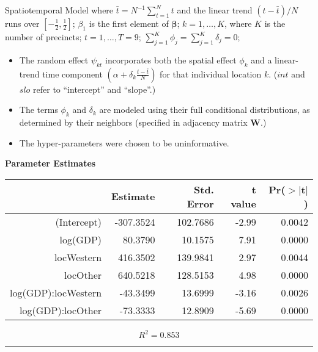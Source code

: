 \documentclass[final]{beamer}
\newlength{\colwidmiddle}
\begin{document}
\begin{frame}[t]
\begin{columns}[t]
\begin{column}{\colwidmiddle}
\begin{alertblock}{Spatiotemporal Model}
\vspace{-.5in}
where $\bar{t} = N^{-1}\sum_{t=1}^N t$ and the linear trend
$(t-\bar{t})/N$ runs over $[-\frac{1}{2}, \frac{1}{2}]$; \quad
$\beta_1$ is the first element of $\mathbf{\beta}$; \quad
$k = 1, \ldots, K$, where $K$ is the number of precincts; \quad
$t=1, \ldots, T=9$; \quad
$\sum_{j=1}^K \phi_j = \sum_{j=1}^K \delta_j = 0$; \quad


\vspace{.5in}

\begin{itemize}
\item The random effect $\psi_{kt}$ incorporates both the spatial
  effect $\phi_k$ and a linear-trend time component $(\alpha +
  \delta_k \frac{t - \bar{t}}{N})$ for that
  individual location $k$. ($int$ and $slo$ refer
  to ``intercept'' and ``slope''.)
\item The terms $\phi_k$ and $\delta_k$ are modeled using their full
  conditional distributions, as determined by their neighbors
  (specified in adjacency matrix $\mathbf{W}$.)
\item The hyper-parameters were chosen to be uninformative.
\end{itemize}




\vspace{1.5in}
\textbf{Parameter Estimates}    
   {\small 
     \begin{table}[ht]
       \centering
       \begin{tabular}{rrrrr}
  \hline
 & Estimate & Std. Error & t value & Pr($>$$|$t$|$) \\ 
  \hline
(Intercept) & -307.3524 & 102.7686 & -2.99 & 0.0042 \\ 
  log(GDP) & 80.3790 & 10.1575 & 7.91 & 0.0000 \\ 
  locWestern & 416.3502 & 139.9841 & 2.97 & 0.0044 \\ 
  locOther & 640.5218 & 128.5153 & 4.98 & 0.0000 \\ 
  log(GDP):locWestern & -43.3499 & 13.6999 & -3.16 & 0.0026 \\ 
  log(GDP):locOther & -73.3333 & 12.8909 & -5.69 & 0.0000 \\ 
   \hline
\end{tabular}
\end{table}} 
  \[
   R^2 = 0.853
  \]

  
  \rule{\textwidth}{1pt}
  

\end{alertblock}
\end{column}
\end{columns}
\end{frame}
\end{document}
